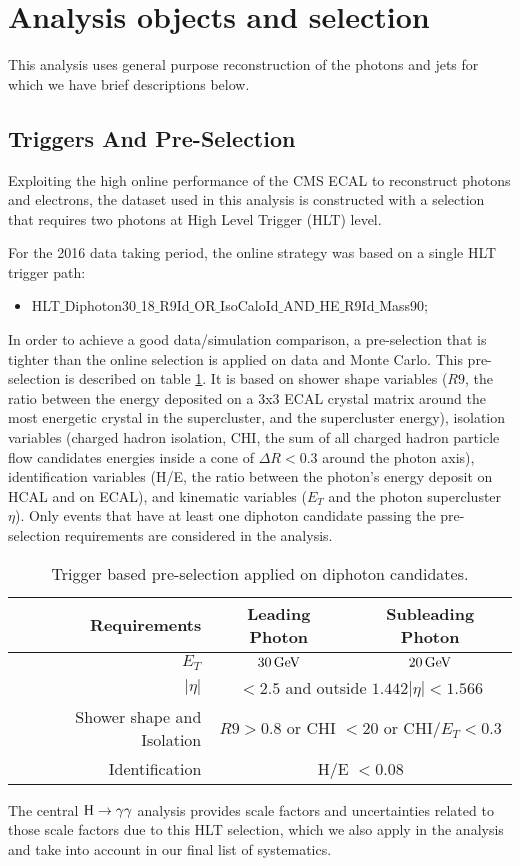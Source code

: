 \section{Analysis objects and selection}
This analysis uses general purpose reconstruction of the photons and jets for which we
have brief descriptions below.

\subsection{Triggers And Pre-Selection}
\label{sec:trigger}
Exploiting the high online performance of the CMS ECAL to reconstruct photons and electrons, the dataset used in this analysis is constructed with a selection that requires two photons at High Level Trigger (HLT) level.

For the 2016 data taking period, the online strategy was based on a single HLT trigger path:
\begin{itemize}
\item HLT$\_$Diphoton30$\_$18$\_$R9Id$\_$OR$\_$IsoCaloId$\_$AND$\_$HE$\_$R9Id$\_$Mass90;
\end{itemize}

In order to achieve a good data/simulation comparison, a pre-selection that is tighter than the online selection is applied on data and Monte Carlo. This pre-selection is described on table \ref{tab:preselection}. It is based on shower shape variables ($R9$, the ratio between the energy deposited on a 3x3 ECAL crystal matrix around the most energetic crystal in the supercluster, and the supercluster energy), isolation variables (charged hadron isolation, CHI, the sum of all charged hadron particle flow candidates energies inside a cone of $\Delta R < 0.3$ around the photon axis), identification variables (H/E, the ratio between the photon's energy deposit on HCAL and on ECAL), and kinematic variables ($E_{T}$ and the photon supercluster $\eta$). Only events that have at least one diphoton candidate passing the pre-selection requirements are considered in the analysis.

 \begin{table}[h]
\centering
\small{
\begin{tabular}{rcc}
Requirements & Leading Photon & Subleading Photon \\ \hline
$E_{T}$ & $30 \,\text{Ge\hspace{-.08em}V}$ & $20 \,\text{Ge\hspace{-.08em}V}$ \\ \hline
$|\eta|$ & \multicolumn{2}{c}{ $< 2.5$ and outside $1.442  |\eta| < 1.566$ } \\ \hline
Shower shape and Isolation & \multicolumn{2}{c}{ $R9 > 0.8$ or CHI $< 20$ or CHI/$E_{T} < 0.3$} \\ \hline
Identification & \multicolumn{2}{c}{ H/E $< 0.08$} \\ \hline
\end{tabular}
}
\caption{\small Trigger based pre-selection applied on diphoton candidates.  \label{tab:preselection}}
\end{table}

The central $\mathrm{H}\to\gamma\gamma$ analysis provides scale factors and uncertainties related to those scale factors due to this HLT selection, which we also apply in the analysis and take into account in our final list of systematics. 
